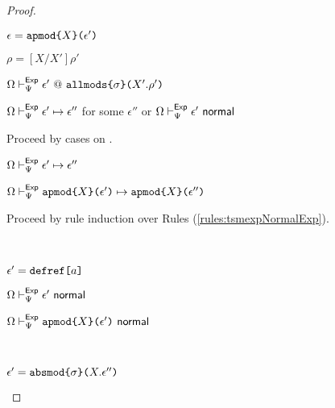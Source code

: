 \begin{proof}
\begin{byCases}
\begin{pfsteps*}
      \item $\epsilon=\texttt{apmod}\texttt{\{}X\texttt{\}(}\epsilon'\texttt{)}$ 
      \item $\rho=[X/X']\rho'$ 
      \item $\Omega \vdash_{\Psi}^{\mathsf{Exp}} \epsilon' ~@~ \texttt{allmods}\texttt{\{}\sigma\texttt{\}(}X'.\rho'\texttt{)}$  
      \item $\Omega \vdash_{\Psi}^\mathsf{Exp} \epsilon' \mapsto \epsilon''$ for some $\epsilon''$ or $\Omega \vdash_{\Psi}^\mathsf{Exp} \epsilon'~\mathsf{normal}$  
    \end{pfsteps*}
    Proceed by cases on .
    \begin{byCases}
      \item[\tsmexpStepsExp{\Omega}{\Psi}{\epsilon'}{\epsilon''}] 
        \begin{pfsteps*}
          \item $\Omega \vdash_{\Psi}^\mathsf{Exp} \epsilon' \mapsto \epsilon''$  
          \item $\Omega \vdash_{\Psi}^\mathsf{Exp} \texttt{apmod}\texttt{\{}X\texttt{\}(}\epsilon'\texttt{)} \mapsto \texttt{apmod}\texttt{\{}X\texttt{\}(}\epsilon''\texttt{)}$ 
        \end{pfsteps*}
      \item[\tsmexpNormalExp{\Omega}{\Psi}{\epsilon'}] Proceed by rule induction over Rules (\ref{rules:tsmexpNormalExp}).
        \begin{byCases}
          \item[\text{(\ref{rule:tsmexpNormalExp-defref})}] ~
            \begin{pfsteps*}
              \item $\epsilon' = \texttt{defref}\texttt{[}a\texttt{]}$ 
              \item $\Omega \vdash_{\Psi}^\mathsf{Exp} \epsilon'~\mathsf{normal}$  
              \item $\Omega \vdash_{\Psi}^\mathsf{Exp} \texttt{apmod}\texttt{\{}X\texttt{\}(}\epsilon'\texttt{)}~\mathsf{normal}$ 
            \end{pfsteps*}
          \item[\text{(\ref{rule:tsmexpNormalExp-absmod})}] ~
            \begin{pfsteps*}
              \item $\epsilon' = \texttt{absmod}\texttt{\{}\sigma\texttt{\}(}X.\epsilon''\texttt{)}$ 

\end{pfsteps*}
\end{byCases}
\end{byCases}
\end{byCases}
\end{proof}
